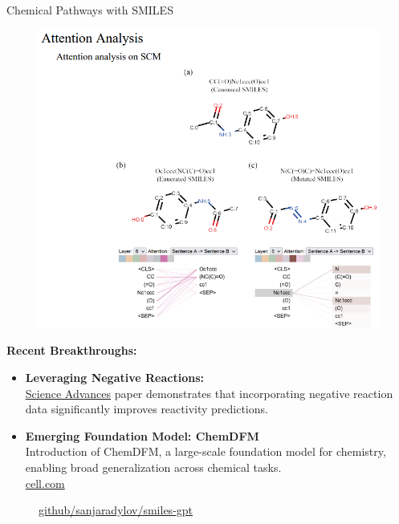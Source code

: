 \begin{frame}[allowframebreaks]{Chemical Pathways with SMILES}
    \begin{figure}
        \centering
        \includegraphics[height=0.9\textheight,width=1\textwidth,keepaspectratio]{images/science/smile-attention.png}
    \end{figure}

    \framebreak
    \textbf{Recent Breakthroughs:}

    \begin{itemize}
        \item \textbf{Leveraging Negative Reactions:} \\
        \href{https://www.science.org/doi/10.1126/sciadv.adk1426}{Science Advances} paper demonstrates that incorporating negative reaction data significantly improves reactivity predictions. \\
        \vspace{0.5em}
        \item \textbf{Emerging Foundation Model: ChemDFM} \\
        Introduction of ChemDFM, a large-scale foundation model for chemistry, enabling broad generalization across chemical tasks. \\
        \href{https://www.cell.com/}{cell.com}
    \end{itemize}

    \framebreak

    \begin{figure}
        \centering
        \href{https://github.com/sanjaradylov/smiles-gpt/blob/master/notebooks/language-modeling.ipynb}{github/sanjaradylov/smiles-gpt}
    \end{figure}


\end{frame}
